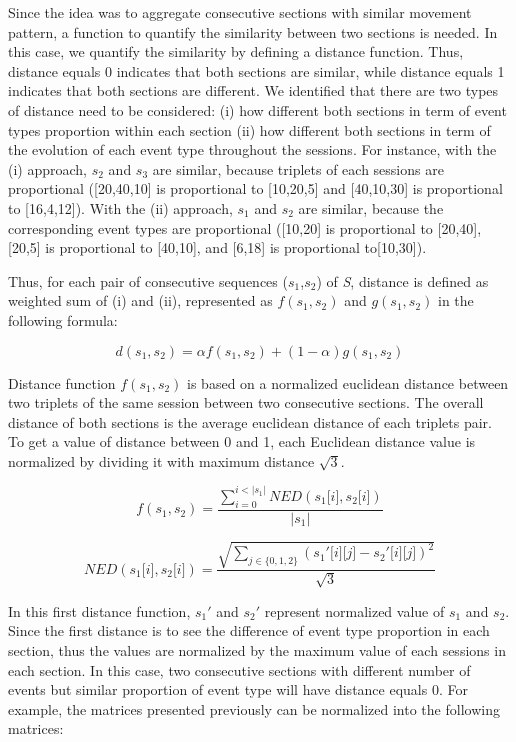 Since the idea was to aggregate consecutive sections with similar movement pattern, a function to quantify the similarity between two sections is needed. In this case, we quantify the similarity by defining a distance function. Thus, distance equals 0 indicates that both sections are similar, while distance equals 1 indicates that both sections are different. We identified that there are two types of distance need to be considered: (i) how different both sections in term of event types proportion within each section (ii) how different both sections in term of the evolution of each event type throughout the sessions. For instance, with the (i) approach, $s_2$ and $s_3$ are similar, because triplets of each sessions are proportional ([20,40,10] is proportional to [10,20,5] and [40,10,30] is proportional to [16,4,12]). With the (ii) approach, $s_1$ and $s_2$ are similar, because the corresponding event types are proportional ([10,20] is proportional to [20,40], [20,5] is proportional to [40,10], and [6,18] is proportional to[10,30]).

Thus, for each pair of consecutive sequences ($\textit{s}_1$,$\textit{s}_2$) of \textit{S}, distance is defined as weighted sum of (i) and (ii), represented as $\textit{f}(\textit{s}_1,\textit{s}_2)$ and $\textit{g}(\textit{s}_1,\textit{s}_2)$ in the following formula:

$$d(\textit{s}_1,\textit{s}_2) = \alpha\textit{f}(\textit{s}_1,\textit{s}_2) + (1 - \alpha)\textit{g}(\textit{s}_1,\textit{s}_2)$$

Distance function $f(\textit{s}_1,\textit{s}_2)$ is based on a normalized euclidean distance between two triplets of the same session between two consecutive sections. The overall distance of both sections is the average euclidean distance of each triplets pair. To get a value of distance between 0 and 1, each Euclidean distance value is normalized by dividing it with maximum distance $\sqrt{3}$.

$$f(\textit{s}_1,\textit{s}_2) = \frac{\displaystyle\sum_{i=0}^{i < \lvert\textit{s}_1\lvert} \textit{N}ED(\textit{s}_1\lbrack i \rbrack,\textit{s}_2\lbrack i \rbrack)}{ \lvert\textit{s}_1\lvert}$$

$$ \textit{N}ED(\textit{s}_1\lbrack i \rbrack,\textit{s}_2\lbrack i \rbrack) = \frac{\sqrt{\displaystyle\sum_{j \in \{0,1,2\}}(\textit{s}_1'\lbrack i \rbrack\lbrack j \rbrack - \textit{s}_2'\lbrack i \rbrack\lbrack j \rbrack)^2}}{\sqrt{3}}$$

In this first distance function, $\textit{s}_1'$ and $\textit{s}_2'$ represent normalized value of $\textit{s}_1$ and $\textit{s}_2$. Since the first distance is to see the difference of event type proportion in each section, thus the values are normalized by the maximum value of each sessions in each section. In this case, two consecutive sections with different number of events but similar proportion of event type will have distance equals 0.  For example, the matrices presented previously can be normalized into the following matrices:

